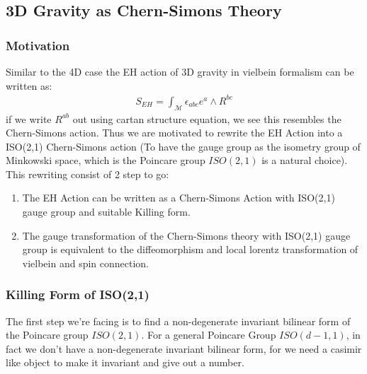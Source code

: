 \subsection{3D Gravity as Chern-Simons Theory}

\subsubsection{Motivation}

Similar to the 4D case the EH action of 3D gravity in vielbein
formalism can be written as:
\begin{align}
  S_{EH} =  \int_{\mathcal{M}}
  \epsilon_{abc} e^a \wedge R^{bc}
\end{align}
if we write $ R^{ab} $ out using cartan structure equation, we see
this resembles the Chern-Simons action. Thus we are motivated to
rewrite the EH Action into a ISO(2,1) Chern-Simons action (To have
  the gauge group as the isometry group of Minkowski space, which is
the Poincare group $ ISO(2,1) $ is a natural choice). This rewriting
consist of 2 step to go:
\begin{enumerate}
  \item The EH Action can be written as a Chern-Simons Action with
    ISO(2,1) gauge group and suitable Killing form.
  \item The gauge transformation of the Chern-Simons theory with
    ISO(2,1) gauge group is equivalent to the diffeomorphism and
    local lorentz transformation of vielbein and spin connection.
\end{enumerate}

\subsubsection{Killing Form of ISO(2,1) }

The first step we're facing is to find a non-degenerate invariant
bilinear form of the Poincare group $ ISO(2,1) $. For a general
Poincare Group $ISO(d-1,1)$, in fact we don't have a non-degenerate
invariant bilinear form, for we need a casimir like object to make it
invariant and give out a number.

